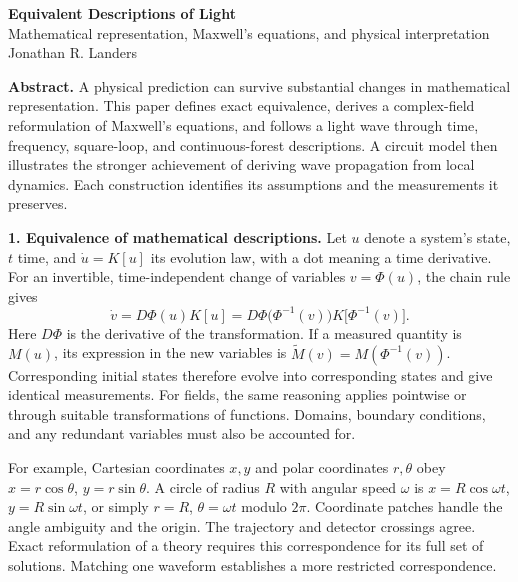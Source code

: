\documentclass[11pt,letterpaper]{article}
\begin{document}
\begin{center}
{\Large\bfseries Equivalent Descriptions of Light}\\[4pt]
{\normalsize Mathematical representation, Maxwell's equations, and physical interpretation}\\[6pt]
{\normalsize Jonathan R. Landers}
\end{center}
\textbf{Abstract.} A physical prediction can survive substantial changes in mathematical representation. This paper defines exact equivalence, derives a complex-field reformulation of Maxwell's equations, and follows a light wave through time, frequency, square-loop, and continuous-forest descriptions. A circuit model then illustrates the stronger achievement of deriving wave propagation from local dynamics. Each construction identifies its assumptions and the measurements it preserves.

\textbf{1. Equivalence of mathematical descriptions.}
Let $u$ denote a system's state, $t$ time, and $\dot u=K[u]$ its evolution law, with a dot meaning a time derivative. For an invertible, time-independent change of variables $v=\Phi(u)$, the chain rule gives
\begin{equation}
\dot v=D\Phi(u)K[u]
=D\Phi\bigl(\Phi^{-1}(v)\bigr)K\bigl[\Phi^{-1}(v)\bigr].
\end{equation}
Here $D\Phi$ is the derivative of the transformation. If a measured quantity is $M(u)$, its expression in the new variables is $\widetilde M(v)=M(\Phi^{-1}(v))$. Corresponding initial states therefore evolve into corresponding states and give identical measurements. For fields, the same reasoning applies pointwise or through suitable transformations of functions. Domains, boundary conditions, and any redundant variables must also be accounted for.

For example, Cartesian coordinates $x,y$ and polar coordinates $r,\theta$ obey $x=r\cos\theta$, $y=r\sin\theta$. A circle of radius $R$ with angular speed $\omega$ is $x=R\cos\omega t$, $y=R\sin\omega t$, or simply $r=R$, $\theta=\omega t$ modulo $2\pi$. Coordinate patches handle the angle ambiguity and the origin. The trajectory and detector crossings agree. Exact reformulation of a theory requires this correspondence for its full set of solutions. Matching one waveform establishes a more restricted correspondence.
\end{document}
